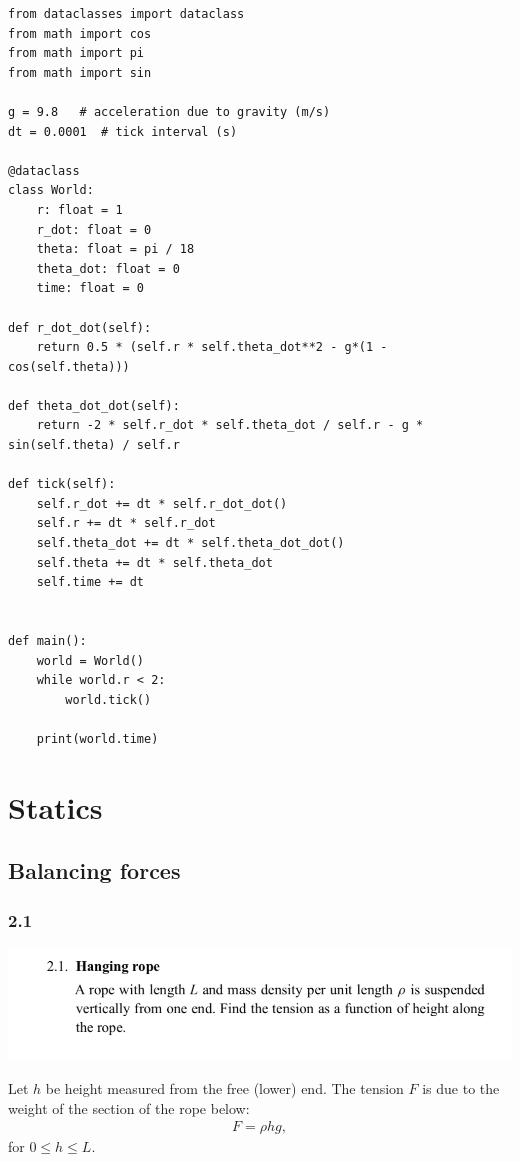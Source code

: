 \begin{verbatim}
from dataclasses import dataclass
from math import cos
from math import pi
from math import sin

g = 9.8   # acceleration due to gravity (m/s)
dt = 0.0001  # tick interval (s)

@dataclass
class World:
    r: float = 1
    r_dot: float = 0
    theta: float = pi / 18
    theta_dot: float = 0
    time: float = 0

def r_dot_dot(self):
    return 0.5 * (self.r * self.theta_dot**2 - g*(1 - cos(self.theta)))

def theta_dot_dot(self):
    return -2 * self.r_dot * self.theta_dot / self.r - g * sin(self.theta) / self.r

def tick(self):
    self.r_dot += dt * self.r_dot_dot()
    self.r += dt * self.r_dot
    self.theta_dot += dt * self.theta_dot_dot()
    self.theta += dt * self.theta_dot
    self.time += dt


def main():
    world = World()
    while world.r < 2:
        world.tick()

    print(world.time)
\end{verbatim}

\section{Statics}
\subsection*{Balancing forces}
\subsubsection*{2.1}
\begin{mdframed}
  \includegraphics[width=400pt]{img/physics--classical-mechanics--morin--2-1.png}
\end{mdframed}

Let $h$ be height measured from the free (lower) end. The tension $F$ is due to the weight of the
section of the rope below:
\begin{align*}
  F = \rho hg,
\end{align*}
for $0 \leq h \leq L$. \checkmark

